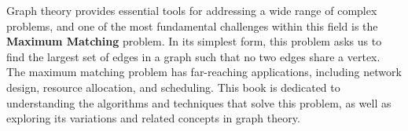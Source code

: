 Graph theory provides essential tools for addressing a wide range of complex problems, and one of the most fundamental challenges within this field is the \textbf{Maximum Matching} problem. In its simplest form, this problem asks us to find the largest set of edges in a graph such that no two edges share a vertex. The maximum matching problem has far-reaching applications, including network design, resource allocation, and scheduling. This book is dedicated to understanding the algorithms and techniques that solve this problem, as well as exploring its variations and related concepts in graph theory.

